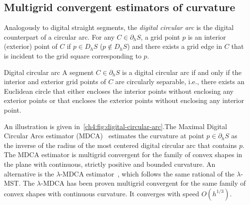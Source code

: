 \subsection{Multigrid convergent estimators of curvature}

Analogously to digital straight segments, the \emph{digital circular arc} is the digital counterpart of a circular arc. For any $C \in \partial_h S$, a grid point $p$ is an interior (exterior) point of $C$ if $p \in D_h S$ ($p \notin D_h S$) and there exists a grid edge in $C$ that is incident to the grid square corresponding to $p$.

\begin{definition}{Digital circular arc} 
A segment $C \in \partial_h S$ is a digital circular arc if and only if the interior and exterior grid points of $C$ are circularly separable, i.e., there exists an Euclidean circle that either encloses the interior points without enclosing any exterior points or that encloses the exterior points without enclosing any interior point.
\end{definition}

An illustration is given in~\cref{ch4:fig:digital-circular-arc}.The Maximal Digital Circular Arcs estimator (MDCA)~\cite{roussillon11mdca} estimates the curvature at point $p \in \partial_h S$ as the inverse of the radius of the most centered digital circular arc that contains $p$. The MDCA estimator is multigrid convergent for the family of convex shapes in the plane with continuous, strictly positive and bounded curvature. An alternative is the $\lambda$-MDCA estimator~\cite{schindele17mdca}, which follows the same rational of the $\lambda$-MST. The $\lambda$-MDCA has been proven multigrid convergent for the same family of convex shapes with continuous curvature. It converges with speed $O(h^{1/3})$.


